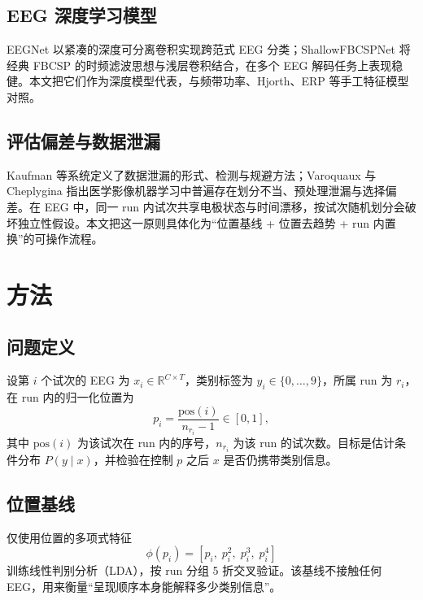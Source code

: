\documentclass[twocolumn,10pt]{ctexart}
\begin{document}
\subsection{EEG 深度学习模型}

EEGNet 以紧凑的深度可分离卷积实现跨范式 EEG 分类\cite{eegnet}；ShallowFBCSPNet 将经典 FBCSP 的时频滤波思想与浅层卷积结合，在多个 EEG 解码任务上表现稳健\cite{shallow}。本文把它们作为深度模型代表，与频带功率、Hjorth、ERP 等手工特征模型对照。

\subsection{评估偏差与数据泄漏}

Kaufman 等系统定义了数据泄漏的形式、检测与规避方法\cite{leakage}；Varoquaux 与 Cheplygina 指出医学影像机器学习中普遍存在划分不当、预处理泄漏与选择偏差\cite{mlfail}。在 EEG 中，同一 run 内试次共享电极状态与时间漂移，按试次随机划分会破坏独立性假设。本文把这一原则具体化为“位置基线 + 位置去趋势 + run 内置换”的可操作流程。

\section{方法}

\subsection{问题定义}

设第 $i$ 个试次的 EEG 为 $x_i\in\mathbb{R}^{C\times T}$，类别标签为 $y_i\in\{0,\dots,9\}$，所属 run 为 $r_i$，在 run 内的归一化位置为
\begin{equation}
p_i=\frac{\mathrm{pos}(i)}{n_{r_i}-1}\in[0,1],
\end{equation}
其中 $\mathrm{pos}(i)$ 为该试次在 run 内的序号，$n_{r_i}$ 为该 run 的试次数。目标是估计条件分布 $P(y\mid x)$，并检验在控制 $p$ 之后 $x$ 是否仍携带类别信息。

\subsection{位置基线}

仅使用位置的多项式特征
\begin{equation}
\phi(p_i)=\left[p_i,\;p_i^2,\;p_i^3,\;p_i^4\right]
\end{equation}
训练线性判别分析（LDA），按 run 分组 5 折交叉验证。该基线不接触任何 EEG，用来衡量“呈现顺序本身能解释多少类别信息”。
\end{document}
